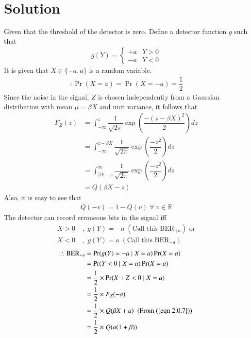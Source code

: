 \documentclass[journal,10pt,twocolumn]{IEEEtran}
\begin{document}
\section{Solution}
Given that the threshold of the detector is zero. Define a detector function $g$ such that
\begin{align}
g(Y) = 
\begin{cases}
+a & Y>0 \\
-a & Y<0
\end{cases}
\end{align}
It is given that $X \in \{ -a, a\}$ is a random variable.
\begin{align}
\therefore \Pr(X=a) = \Pr(X=-a) = \dfrac{1}{2}
\end{align}
Since the noise in the signal, $Z$ is chosen independently from a Gaussian distribution with mean $ \mu = \beta X$ and unit variance, it follows that
\begin{align}
F_Z(z) &= \int_{-\infty}^{z} \dfrac{1}{\sqrt{2\pi}} \exp \left( \dfrac{-(z - \beta X)^2}{2} \right) dz \\
&= \int_{-\infty}^{z - \beta X} \dfrac{1}{\sqrt{2\pi}} \exp \left( \dfrac{-z^2}{2} \right) dz \\
&= \int_{\beta X-z}^{\infty} \dfrac{1}{\sqrt{2\pi}} \exp \left( \dfrac{-z^2}{2} \right) dz \\
&= Q(\beta X - z) \label{eqn 2.0.7}
\end{align}
Also, it is easy to see that 
\begin{align}
Q(-v) = 1 - Q(v) \; \forall \; v \in \mathbb{R} \label{eqn 2.0.8}
\end{align}
The detector can record erroneous bits in the signal iff
\begin{align}
X>0 \; &, \; g(Y) = -a \; (\text{Call this BER}_{+a}) \text{ or}\\
X<0 \; &, \; g(Y) = a \; (\text{Call this BER}_{-a})
\end{align}
\begin{align}
\therefore \text{BER}_{+a} %
&= \Pr(g(Y) = -a \;|\; X = a) \Pr(X=a)\\
&= \Pr(Y < 0 \;|\; X = a) \Pr(X=a)\\
&= \dfrac{1}{2} \times \Pr(X+Z < 0 \;|\; X = a) \\
&= \dfrac{1}{2} \times F_Z(-a)\\
&= \dfrac{1}{2} \times Q(\beta X + a) \; \text{ (From (\ref{eqn 2.0.7}))}\\
&= \dfrac{1}{2} \times Q(a(1+\beta))
\end{align}
\end{document}
